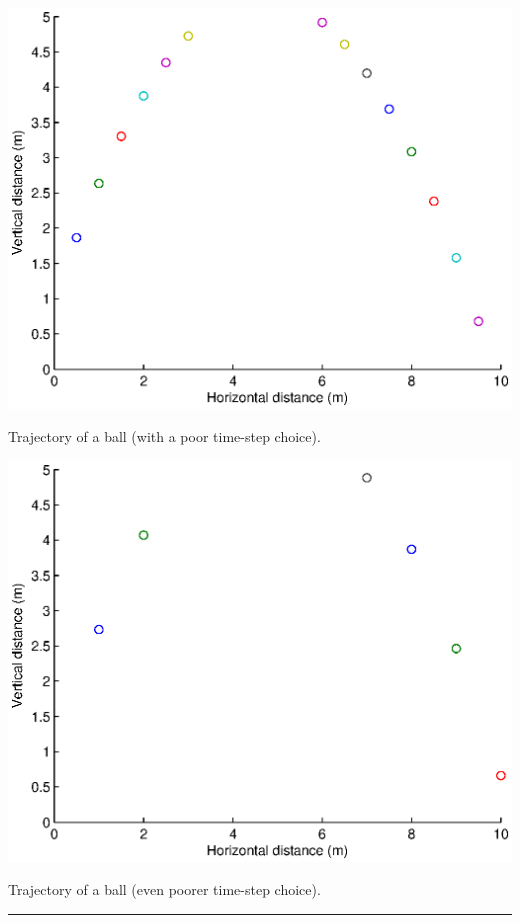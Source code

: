\documentclass{tufte-book} %
\begin{document}
\begin{marginfigure}[-0.0in]
\includegraphics[width=\linewidth]{ch9-ball_uv2.eps}
\caption{Trajectory of a ball (with a poor time-step choice).}
\label{fig:ch9-ball_uv2}
\end{marginfigure}

\begin{marginfigure}[-0.0in]
\includegraphics[width=\linewidth]{ch9-ball_uv3.eps}
\caption{Trajectory of a ball (even poorer time-step choice).}
\label{fig:ch9-ball_uv3}
\end{marginfigure}

\vspace{1mm}
\noindent\rule{4cm}{0.5pt}
\vspace{2mm}
\end{document}
